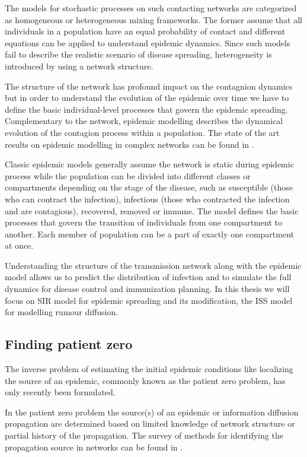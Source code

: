 \documentclass[times, utf8, diplomski]{fer}
\begin{document}
The models for stochastic processes on such contacting networks are categorized as homogeneous or heterogeneous mixing frameworks. The former assume that all individuals in a population have an equal probability of contact and different equations can be applied to understand epidemic dynamics. Since such models fail to describe the realistic scenario of disease spreading,  heterogeneity is introduced by using a network structure.

The structure of the network has profound impact on the contagnion dynamics but in order to understand the evolution of the epidemic over time we have to define the basic individual-level processes that govern the epidemic spreading. Complementary to the network, epidemic modelling describes the dynamical evolution of the contagion process within a population. The state of the art results on epidemic modelling in complex networks can be found in \citet{revmod}.

 Classic epidemic models generally  assume the network is static during epidemic process while the population can be divided into different classes or compartments depending on the stage of the disease, such as susceptible (those who can contract the infection), infectious (those who contracted the infection and are contagious), recovered,  removed or immune. The model defines the basic processes that govern the transition of individuals from one compartment to another.
 Each member of population can be a part of exactly one compartment at once. 
 
 Understanding the structure of the transmission network along with the epidemic model allows us to predict the distribution of infection and to simulate the full dynamics for disease control and immunization planning. In this thesis we will focus on SIR model for epidemic spreading and its modification, the ISS model for modelling rumour diffusion. 


\subsection{Finding patient zero}  
The inverse problem of estimating the initial epidemic conditions like localizing the source of an epidemic, commonly known as the patient zero problem, has only recently been formulated.

In the patient zero problem the source(s) of an epidemic or information diffusion propagation are determined based on limited knowledge of network structure or partial history of the propagation. The survey of methods for identifying the propagation source in networks can be found in \citet{soa_source}.
\end{document}

